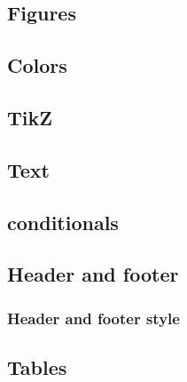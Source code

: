     \subsection{Figures}
    \label{sec:tutorial/preamble/fig}
    
    
    \subsection{Colors}
    \label{sec:tutorial/preamble/color}
    
    
    \subsection{TikZ}
    \label{sec:tutorial/preamble/tikz}
    
    
    \subsection{Text}
    \label{sec:tutorial/preamble/text}
    
    
    \subsection*{\thesubsection\hspace{1em}\Glspl{conditional}}
    \label{sec:tutorial/preamble/conditional}
    
    
    \subsection{Header and footer}
    \label{sec:tutorial/preamble/headfoot}
    
    
        \subsubsection{Header and footer style}
        \label{sec:tutorial/preamble/headfoot/style}
        
    
    \subsection{Tables}
    \label{sec:tutorial/preamble/table}
    
    
